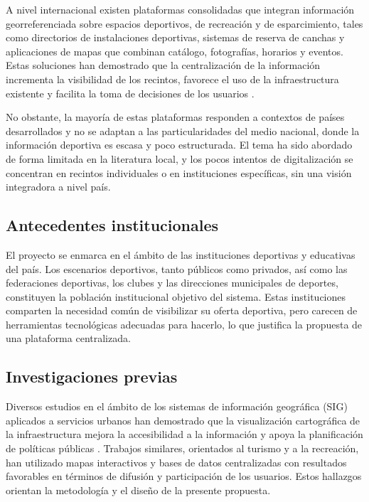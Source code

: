 A nivel internacional existen plataformas consolidadas que integran
informaci\'on georreferenciada sobre espacios deportivos, de recreaci\'on y de
esparcimiento, tales como directorios de instalaciones deportivas, sistemas
de reserva de canchas y aplicaciones de mapas que combinan cat\'alogo,
fotograf\'ias, horarios y eventos. Estas soluciones han demostrado que la
centralizaci\'on de la informaci\'on incrementa la visibilidad de los recintos,
favorece el uso de la infraestructura existente y facilita la toma de
decisiones de los usuarios \citep{longley2015, pressman2010}.

No obstante, la mayor\'ia de estas plataformas responden a contextos de
pa\'ises desarrollados y no se adaptan a las particularidades del medio
nacional, donde la informaci\'on deportiva es escasa y poco estructurada. El
tema ha sido abordado de forma limitada en la literatura local, y los pocos
intentos de digitalizaci\'on se concentran en recintos individuales o en
instituciones espec\'ificas, sin una visi\'on integradora a nivel pa\'is.

\subsection{Antecedentes institucionales}

El proyecto se enmarca en el \'ambito de las instituciones deportivas y
educativas del pa\'is. Los escenarios deportivos, tanto p\'ublicos como
privados, as\'i como las federaciones deportivas, los clubes y las
direcciones municipales de deportes, constituyen la poblaci\'on institucional
objetivo del sistema. Estas instituciones comparten la necesidad com\'un de
visibilizar su oferta deportiva, pero carecen de herramientas tecnol\'ogicas
adecuadas para hacerlo, lo que justifica la propuesta de una plataforma
centralizada.

\subsection{Investigaciones previas}

Diversos estudios en el \'ambito de los sistemas de informaci\'on geogr\'afica
(SIG) aplicados a servicios urbanos han demostrado que la visualizaci\'on
cartogr\'afica de la infraestructura mejora la accesibilidad a la informaci\'on
y apoya la planificaci\'on de pol\'iticas p\'ublicas \citep{longley2015}.
Trabajos similares, orientados al turismo y a la recreaci\'on, han utilizado
mapas interactivos y bases de datos centralizadas con resultados favorables
en t\'erminos de difusi\'on y participaci\'on de los usuarios. Estos hallazgos
orientan la metodolog\'ia y el dise\~no de la presente propuesta.

